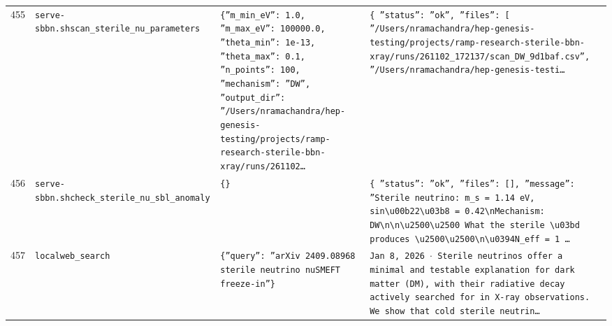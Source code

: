 \documentclass[11pt,a4paper]{article}
\begin{document}
\begin{longtable}{@{}p{}p{}p{}p{}@{}}
455 & \texttt{serve-sbbn.sh}\newline\texttt{scan\_\allowbreak{}sterile\_\allowbreak{}nu\_\allowbreak{}parameters} & \texttt{\{''m\_\allowbreak{}min\_\allowbreak{}eV'':\allowbreak{} 1.0,\allowbreak{} ''m\_\allowbreak{}max\_\allowbreak{}eV'':\allowbreak{} 100000.0,\allowbreak{} ''theta\_\allowbreak{}min'':\allowbreak{} 1e-13,\allowbreak{} ''theta\_\allowbreak{}max'':\allowbreak{} 0.1,\allowbreak{} ''n\_\allowbreak{}points'':\allowbreak{} 100,\allowbreak{} ''mechanism'':\allowbreak{} ''DW'',\allowbreak{} ''output\_\allowbreak{}dir'':\allowbreak{} ''/\allowbreak{}Users/\allowbreak{}nramachandra/\allowbreak{}hep-genesis-testing/\allowbreak{}projects/\allowbreak{}ramp-research-sterile-bbn-xray/\allowbreak{}runs/\allowbreak{}261102\ldots{}\allowbreak{}} & \texttt{\{   ''status'':\allowbreak{} ''ok'',\allowbreak{}   ''files'':\allowbreak{} [     ''/\allowbreak{}Users/\allowbreak{}nramachandra/\allowbreak{}hep-genesis-testing/\allowbreak{}projects/\allowbreak{}ramp-research-sterile-bbn-xray/\allowbreak{}runs/\allowbreak{}261102\_\allowbreak{}172137/\allowbreak{}scan\_\allowbreak{}DW\_\allowbreak{}9d1baf.csv'',\allowbreak{}     ''/\allowbreak{}Users/\allowbreak{}nramachandra/\allowbreak{}hep-genesis-testi\ldots{}\allowbreak{}} \\
456 & \texttt{serve-sbbn.sh}\newline\texttt{check\_\allowbreak{}sterile\_\allowbreak{}nu\_\allowbreak{}sbl\_\allowbreak{}anomaly} & \texttt{\{\}\allowbreak{}} & \texttt{\{   ''status'':\allowbreak{} ''ok'',\allowbreak{}   ''files'':\allowbreak{} []\allowbreak{},\allowbreak{}   ''message'':\allowbreak{} ''Sterile neutrino:\allowbreak{} m\_\allowbreak{}s =\allowbreak{} 1.14 eV,\allowbreak{} sin\textbackslash{}\allowbreak{}u00b22\textbackslash{}\allowbreak{}u03b8 =\allowbreak{} 0.42\textbackslash{}\allowbreak{}nMechanism:\allowbreak{} DW\textbackslash{}\allowbreak{}n\textbackslash{}\allowbreak{}n\textbackslash{}\allowbreak{}u2500\textbackslash{}\allowbreak{}u2500 What the sterile \textbackslash{}\allowbreak{}u03bd produces \textbackslash{}\allowbreak{}u2500\textbackslash{}\allowbreak{}u2500\textbackslash{}\allowbreak{}n\textbackslash{}\allowbreak{}u0394N\_\allowbreak{}eff =\allowbreak{} 1 \ldots{}\allowbreak{}} \\
457 & \texttt{local}\newline\texttt{web\_\allowbreak{}search} & \texttt{\{''query'':\allowbreak{} ''arXiv 2409.08968 sterile neutrino nuSMEFT freeze-in''\}\allowbreak{}} & \texttt{Jan 8,\allowbreak{} 2026 $\cdot$ Sterile neutrinos offer a minimal and testable explanation for dark matter (DM)\allowbreak{},\allowbreak{} with their radiative decay actively searched for in X-ray observations. We show that cold sterile neutrin\ldots{}\allowbreak{}} \\

\end{longtable}
\end{document}
